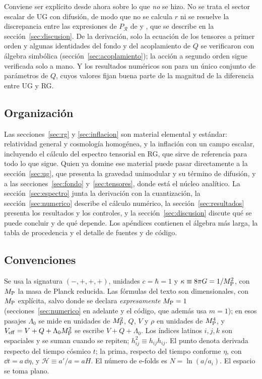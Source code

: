 Conviene ser explícito desde ahora sobre lo que \emph{no} se hizo. No se trata el sector escalar de UG con difusión, de modo que no se calcula $r$ ni se resuelve la discrepancia entre las expresiones de $P_\mathcal{R}$ de \cite{leon22} y \cite{piccirilli23}, que se describe en la sección~\ref{sec:discusion}. De la derivación, solo la ecuación de los tensores a primer orden y algunas identidades del fondo y del acoplamiento de $Q$ se verificaron con álgebra simbólica (sección~\ref{sec:acoplamiento}); la acción a segundo orden sigue verificada solo a mano. Y los resultados numéricos son para un único conjunto de parámetros de $Q$, cuyos valores fijan buena parte de la magnitud de la diferencia entre UG y RG.

\subsection*{Organización}

Las secciones~\ref{sec:rg} y \ref{sec:inflacion} son material elemental y estándar: relatividad general y cosmología homogénea, y la inflación con un campo escalar, incluyendo el cálculo del espectro tensorial en RG, que sirve de referencia para todo lo que sigue. Quien ya domine ese material puede pasar directamente a la sección~\ref{sec:ug}, que presenta la gravedad unimodular y su término de difusión, y a las secciones~\ref{sec:fondo} y~\ref{sec:tensores}, donde está el núcleo analítico. La sección~\ref{sec:espectro} junta la derivación con la cuantización, la sección~\ref{sec:numerico} describe el cálculo numérico, la sección~\ref{sec:resultados} presenta los resultados y los controles, y la sección~\ref{sec:discusion} discute qué se puede concluir y de qué depende. Los apéndices contienen el álgebra más larga, la tabla de procedencia y el detalle de fuentes y de código.

\subsection*{Convenciones}

Se usa la signatura $(-,+,+,+)$, unidades $c=\hbar=1$ y $\kappa\equiv 8\pi G=1/M_{\rm P}^2$, con $M_{\rm P}$ la masa de Planck reducida. Las fórmulas del texto son dimensionales, con $M_{\rm P}$ explícita, salvo donde se declara \emph{expresamente} $M_{\rm P}=1$ (secciones~\ref{sec:numerico} en adelante y el código, que además usa $m=1$); en esos pasajes $\Lambda_0$ se mide en unidades de $M_{\rm P}^2$, $Q$, $V$ y $\rho$ en unidades de $M_{\rm P}^4$, y $V_{\rm eff}=V+Q+\Lambda_0M_{\rm P}^2$ se escribe $V+Q+\Lambda_0$. Los índices latinos $i,j,k$ son espaciales y se suman cuando se repiten; $h_{ij}^2\equiv h_{ij}h_{ij}$. El punto denota derivada respecto del tiempo cósmico $t$; la prima, respecto del tiempo conforme $\eta$, con $\dd t=a\,\dd\eta$, y $\mathcal H\equiv a'/a=aH$. El número de e-folds es $N=\ln(a/a_i)$. El espacio se toma plano.
